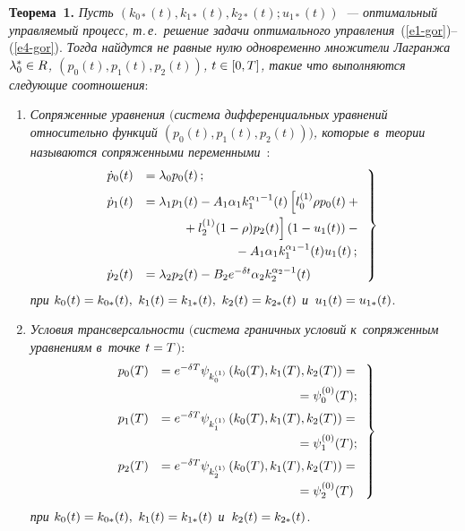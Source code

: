 \begin{multicols}{2}
\smallskip

\noindent
\textbf{Теорема~1.} 
\textit{Пусть $(k_{0*}(t), k_{1*}(t),k_{2*}(t); u_{1*}(t))$~--- 
оптимальный управ\-ля\-емый процесс, т.\,е.\ решение задачи оптимального управ\-ле\-ния}~(\ref{e1-gor})--(\ref{e4-gor}). 
\textit{Тогда \mbox{найдутся} не равные нулю одновременно множители Лагранжа $\lambda^{*}_0 \hm
\in R$, $(p_0(t),p_1(t),p_2(t))$, $t \hm\in [0,T]$, такие что выполняются следующие 
соотношения}:
\begin{enumerate}[1.]
\item \textit{Сопряженные уравнения $($система дифференциальных уравнений относительно 
функций $(p_0(t),p_1(t),p_2(t))$$)$, которые в~теории называются сопряженными 
переменными}~\cite{8-gor, 7-gor, 11-gor}:
\begin{equation}
\hspace*{-6mm}
\left.
\begin{array}{rl}
\dot p_0(t)&=\lambda_0 p_0(t)\,;
\\[6pt]
\dot p_1(t)&=\lambda_1p_1(t)-A_1\alpha_1k^{\alpha_1-1}_1(t) 
\left[l^{(1)}_0\rho p_0(t)+{}\right.\\[6pt]
&\hspace*{10mm}\left.{}+l^{(1)}_2(1-\rho)p_2(t)\right]
\left(1-u_1(t)\right)-{}\\[6pt]
&\hspace*{25mm}{}-A_1\alpha_1k^{\alpha_1-1}_1(t)u_1(t)\,;
\\[6pt]
\dot p_2(t)&=\lambda_2 p_2(t)-B_2 e^{-\delta t} \alpha_2 k^{\alpha_2-1}_2(t)
\end{array}\!\right\}\!\!\!\!
\label{e5-gor}
\end{equation}
\textit{при $k_{0}(t)\hm=k_{0*}(t),$ $k_{1}(t)\hm=k_{1*}(t),$ $k_{2}(t)\hm=k_{2*}(t)$ 
и~$u_{1}(t)\hm=u_{1*}(t)$}.

\item \textit{Условия трансверсальности $($система граничных условий 
к~сопряженным уравнениям в~точке $t\hm=T$$)$}:
\begin{equation}
\hspace*{-3mm}\left.
\begin{array}{rl}
p_0(T)&=e^{- \delta T} \psi_{k^{(1)}_0}\left(k_0(T),k_1(T),k_2(T)\right)={}\\[6pt]
&\hspace*{38mm}{}=\psi^{(0)}_0(T);
\\[6pt]
p_1(T)&=e^{- \delta T} \psi_{k^{(1)}_1}\left(k_0(T),k_1(T),k_2(T)\right)={}\\[6pt]
&\hspace*{38mm}{}=\psi^{(0)}_1(T);
\\[6pt] 
p_2(T)&=e^{- \delta T} \psi_{k^{(1)}_2}\left(k_0(T),k_1(T),k_2(T)\right)={}\\[6pt]
&\hspace*{38mm}{}=\psi^{(0)}_2(T)
\end{array}
\right\}\!\!\!
\label{e6-gor}
\end{equation}
\textit{при $k_{0}(t)\hm=k_{0*}(t),$ $k_{1}(t)\hm=k_{1*}(t)$ и~$k_{2}(t)\hm=k_{2*}(t)$}.


\end{enumerate}
\end{multicols}
